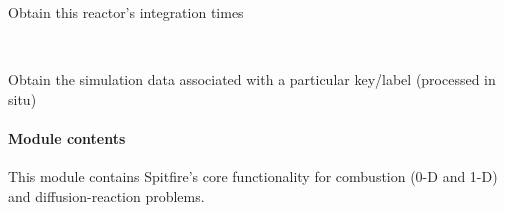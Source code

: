\documentclass[letterpaper,10pt,english]{sphinxmanual}
\begin{document}
\begin{fulllineitems}
\begin{fulllineitems}
\begin{quote}
\begin{description}
\begin{description}
\end{description}

\end{description}\end{quote}

\end{fulllineitems}


\begin{fulllineitems}
\label{\detokenize{spitfire.chemistry.reactors:spitfire.chemistry.reactors.HomogeneousReactor.solution_times}}
Obtain this reactor’s integration times

\end{fulllineitems}


\begin{fulllineitems}
\label{\detokenize{spitfire.chemistry.reactors:spitfire.chemistry.reactors.HomogeneousReactor.temporary_alc_in_tau}}~
\end{fulllineitems}


\begin{fulllineitems}
\label{\detokenize{spitfire.chemistry.reactors:spitfire.chemistry.reactors.HomogeneousReactor.trajectory_data}}
Obtain the simulation data associated with a particular key/label (processed in situ)

\end{fulllineitems}


\end{fulllineitems}



\paragraph{Module contents}
\label{\detokenize{spitfire.chemistry:module-spitfire.chemistry}}\label{\detokenize{spitfire.chemistry:module-contents}}
This module contains Spitfire’s core functionality for combustion (0-D and 1-D) and diffusion-reaction problems.
\end{document}

